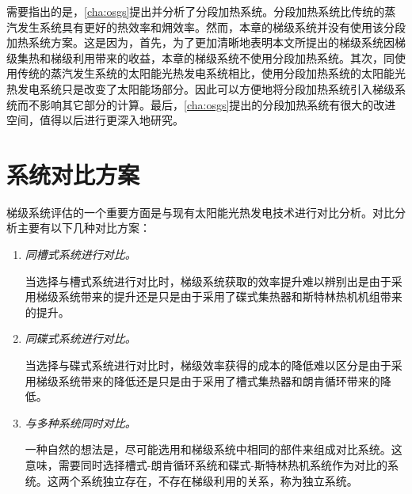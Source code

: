 需要指出的是，\autoref{cha:osgs}提出并分析了分段加热系统。分段加热系统比传统的蒸汽发生系统具有更好的热效率和㶲效率。然而，本章的梯级系统并没有使用该分段加热系统方案。这是因为，首先，为了更加清晰地表明本文所提出的梯级系统因梯级集热和梯级利用带来的收益，本章的梯级系统不使用分段加热系统。其次，同使用传统的蒸汽发生系统的太阳能光热发电系统相比，使用分段加热系统的太阳能光热发电系统只是改变了太阳能场部分。因此可以方便地将分段加热系统引入梯级系统而不影响其它部分的计算。最后，\autoref{cha:osgs}提出的分段加热系统有很大的改进空间，值得以后进行更深入地研究。

\section{系统对比方案}

梯级系统评估的一个重要方面是与现有太阳能光热发电技术进行对比分析。对比分析主要有以下几种对比方案：

\begin{enumerate}[label=(\arabic*)]
	\item \emph{同槽式系统进行对比。} 

	当选择与槽式系统进行对比时，梯级系统获取的效率提升难以辨别出是由于采用梯级系统带来的提升还是只是由于采用了碟式集热器和斯特林热机机组带来的提升。
	\item \emph{同碟式系统进行对比。}
	
	当选择与碟式系统进行对比时，梯级效率获得的成本的降低难以区分是由于采用梯级系统带来的降低还是只是由于采用了槽式集热器和朗肯循环带来的降低。
	\item \emph{与多种系统同时对比。}
	
	一种自然的想法是，尽可能选用和梯级系统中相同的部件来组成对比系统。这意味，需要同时选择槽式-朗肯循环系统和碟式-斯特林热机系统作为对比的系统。这两个系统独立存在，不存在梯级利用的关系，称为独立系统。
	
\end{enumerate}

